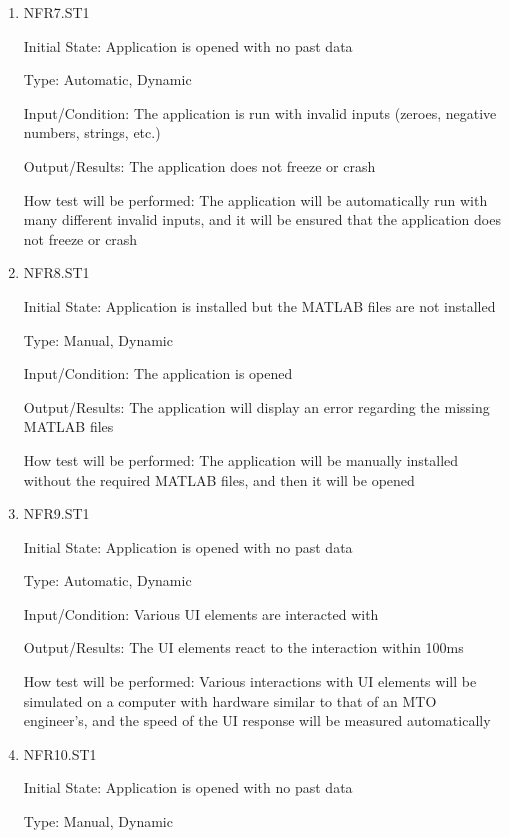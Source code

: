 \documentclass[12pt, titlepage]{article}
\begin{document}
\begin{enumerate}

\item{NFR7.ST1\\}

Initial State: Application is opened with no past data

Type: Automatic, Dynamic

Input/Condition: The application is run with invalid inputs (zeroes, negative numbers, strings, etc.)

Output/Results: The application does not freeze or crash

How test will be performed: The application will be automatically run with many different invalid inputs, and it will be ensured that the application does not freeze or crash

\item{NFR8.ST1\\}

Initial State: Application is installed but the MATLAB files are not installed

Type: Manual, Dynamic

Input/Condition: The application is opened

Output/Results: The application will display an error regarding the missing MATLAB files

How test will be performed: The application will be manually installed without the required MATLAB files, and then it will be opened

\item{NFR9.ST1\\}

Initial State: Application is opened with no past data

Type: Automatic, Dynamic

Input/Condition: Various UI elements are interacted with

Output/Results: The UI elements react to the interaction within 100ms

How test will be performed: Various interactions with UI elements will be simulated on a computer with hardware similar to that of an MTO engineer's, and the speed of the UI response will be measured automatically

\item{NFR10.ST1\\}

Initial State: Application is opened with no past data

Type: Manual, Dynamic


\end{enumerate}
\end{document}
